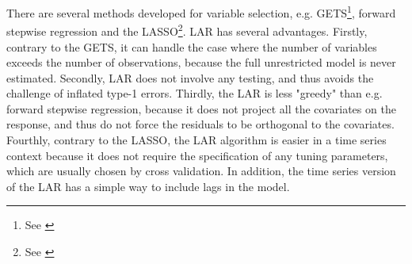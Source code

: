 There are several methods developed for variable selection, e.g. GETS\footnote{See \cite{campos2003}}, forward stepwise regression and the LASSO\footnote{See \cite{tibshirani1996}}. LAR has several advantages. Firstly, contrary to the GETS, it can handle the case where the number of variables exceeds the number of observations, because the full unrestricted model is never estimated. Secondly, LAR does not involve any testing, and thus avoids the challenge of inflated type-1 errors. Thirdly, the LAR is less "greedy" than e.g. forward stepwise regression, because it does not project all the covariates on the response, and thus do not force the residuals to be orthogonal to the covariates. Fourthly, contrary to the LASSO, the LAR algorithm is easier in a time series context because it does not require the specification of any tuning parameters, which are usually chosen by cross validation. In addition, the time series version of the LAR has a simple way to include lags in the model.
